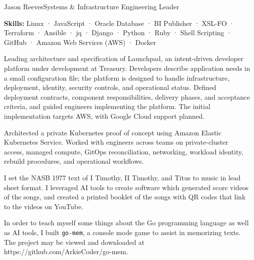 \documentclass{article}
\begin{document}
\begin{cv}{Jason Reeves}{Systems \& Infrastructure Engineering Leader}
\begin{cvevent}[Mar 2018][Aug 2021]
  \vspace*{3mm}
  \textbf{Skills:}  Linux · JavaScript · Oracle Database · BI Publisher · XSL-FO · Terraform · Ansible · jq · Django · Python · Ruby · Shell Scripting · GitHub · Amazon Web Services (AWS) · Docker
\end{cvevent}


\onecolumn
{}  %
\begin{cvevent}[2026]
    Leading architecture and specification of Launchpad, an intent-driven developer platform under development at Treasury. Developers describe application needs in a small configuration file; the platform is designed to handle infrastructure, deployment, identity, security controls, and operational status. Defined deployment contracts, component responsibilities, delivery phases, and acceptance criteria, and guided engineers implementing the platform. The initial implementation targets AWS, with Google Cloud support planned.
    \vspace*{5mm}
\end{cvevent}

\begin{cvevent}[2026]
    Architected a private Kubernetes proof of concept using Amazon Elastic Kubernetes Service. Worked with engineers across teams on private-cluster access, managed compute, GitOps reconciliation, networking, workload identity, rebuild procedures, and operational workflows.
    \vspace*{5mm}
\end{cvevent}

\begin{cvevent}[2025]
    I set the NASB 1977 text of I Timothy, II Timothy, and Titus to music in lead sheet format.  I leveraged AI tools to create software which generated score videos of the songs, and created a printed booklet of the songs with QR codes that link to the videos on YouTube.
    \vspace*{5mm}
\end{cvevent}

\begin{cvevent}[2025]
    In order to teach myself some things about the Go programming language as well as AI tools, I built \texttt{go-mem}, a console mode game to assist in memorizing texts.  The project may be viewed and downloaded at https://github.com/ArkieCoder/go-mem.
    \vspace*{5mm}
\end{cvevent}


\end{cv}
\end{document}
